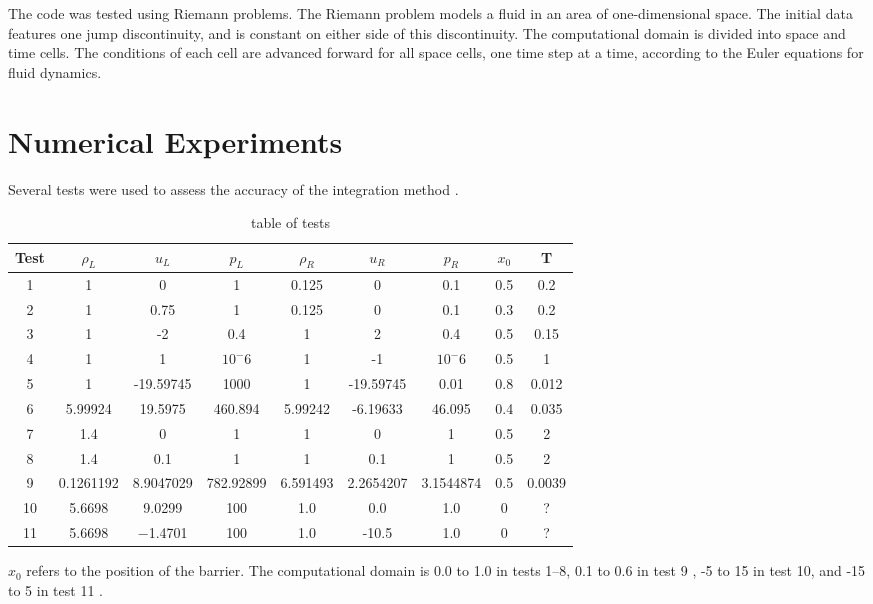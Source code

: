 \documentclass[letterpaper,12pt]{article}
\begin{document}
The code was tested using Riemann problems. The Riemann problem models a fluid in an area of one-dimensional space. The initial data features one jump discontinuity, and is constant on either side of this discontinuity. The computational domain is divided into space and time cells. The conditions of each cell are advanced forward for all space cells, one time step at a time, according to the Euler equations for fluid dynamics. \cite{Leveque2002}


\section{Numerical Experiments}
Several tests were used to assess the accuracy of the integration method \cite{LiskaWendroff2003}. 
\begin{table}
\begin{center}
\begin{tabular}{ |c|c c c|c c c|c c| }
 \hline
 Test & $\rho_L$ & $u_L$ & $p_L$ & $\rho_R$ & $u_R$ & $p_R$ & $x_0$ & T \\
 \hline
 1 & 1 & 0 & 1 & 0.125 & 0 & 0.1 & 0.5 & 0.2 \\
 2 & 1 & 0.75 & 1 & 0.125 & 0 & 0.1 & 0.3 & 0.2 \\
 3 & 1 & -2 & 0.4 & 1 & 2 & 0.4 & 0.5 & 0.15 \\
 4 & 1 & 1 & $10^-6$ & 1 & -1 & $10^-6$ & 0.5 & 1 \\
 5 & 1 & -19.59745 & 1000 & 1 & -19.59745 & 0.01 & 0.8 & 0.012 \\
 6 & 5.99924 & 19.5975 & 460.894 & 5.99242 & -6.19633 & 46.095 & 0.4 & 0.035 \\
 7 & 1.4 & 0 & 1 & 1 & 0 & 1 & 0.5 & 2 \\
 8 & 1.4 & 0.1 & 1 & 1 & 0.1 & 1 & 0.5 & 2 \\
 9 & 0.1261192 & 8.9047029 & 782.92899 & 6.591493 & 2.2654207 & 3.1544874 & 0.5 & 0.0039 \\
10 & 5.6698 & 9.0299 & 100 & 1.0 & 0.0 & 1.0 & 0 & ? \\
11 & 5.6698 & −1.4701 & 100 & 1.0 & -10.5 & 1.0 & 0 & ? \\
 \hline
\end{tabular}
  \caption{table of tests}
  \label{tab:testtable}
\end{center}
\end{table}
$x_0$ refers to the position of the barrier. The computational domain is 0.0 to 1.0 in tests 1--8, 0.1 to 0.6 in test 9 \cite{LiskaWendroff2003}, -5 to 15 in test 10, and -15 to 5 in test 11 \cite{Leveque2002}. 
\end{document}
